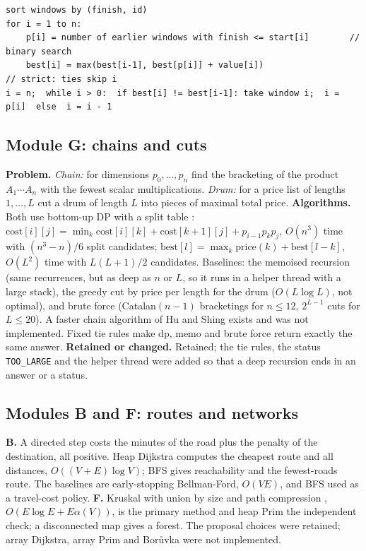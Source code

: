 \documentclass[11pt,a4paper]{article}
\newcommand{\cs}[1]{\texttt{#1}}
\begin{document}
\begin{lstlisting}[caption={Module C, weighted-interval DP with binary search.},captionpos=b,label=lst:c]
sort windows by (finish, id)
for i = 1 to n:
    p[i] = number of earlier windows with finish <= start[i]        // binary search
    best[i] = max(best[i-1], best[p[i]] + value[i])                  // strict: ties skip i
i = n;  while i > 0:  if best[i] != best[i-1]: take window i;  i = p[i]  else  i = i - 1
\end{lstlisting}

\subsection{Module G: chains and cuts}
\textbf{Problem.} \emph{Chain:} for dimensions $p_0,\dots,p_n$ find the bracketing of the product $A_1\cdots A_n$ with the fewest scalar multiplications. \emph{Drum:} for a price list of lengths $1,\dots,L$ cut a drum of length $L$ into pieces of maximal total price.
\textbf{Algorithms.} Both use bottom-up DP with a split table \cite{clrs}: $\text{cost}[i][j]=\min_k \text{cost}[i][k]+\text{cost}[k{+}1][j]+p_{i-1}p_kp_j$, $O(n^3)$ time with $(n^3-n)/6$ split candidates; $\text{best}[l]=\max_k \text{price}(k)+\text{best}[l-k]$, $O(L^2)$ time with $L(L+1)/2$ candidates.
Baselines: the memoised recursion (same recurrences, but as deep as $n$ or $L$, so it runs in a helper thread with a large stack), the greedy cut by price per length for the drum ($O(L\log L)$, not optimal), and brute force (Catalan$(n-1)$ bracketings for $n\le12$, $2^{L-1}$ cuts for $L\le20$). A faster chain algorithm of Hu and Shing \cite{hs} exists and was not implemented.
Fixed tie rules make dp, memo and brute force return exactly the same answer. \textbf{Retained or changed.} Retained; the tie rules, the status \cs{TOO\_LARGE} and the helper thread were added so that a deep recursion ends in an answer or a status.

\subsection{Modules B and F: routes and networks}
\textbf{B.} A directed step costs the minutes of the road plus the penalty of the destination, all positive. Heap Dijkstra \cite{dij} computes the cheapest route and all distances, $O((V+E)\log V)$; BFS gives reachability and the fewest-roads route.
The baselines are early-stopping Bellman-Ford, $O(VE)$, and BFS used as a travel-cost policy. \textbf{F.} Kruskal \cite{kru} with union by size and path compression \cite{tar}, $O(E\log E+E\alpha(V))$, is the primary method and heap Prim the independent check; a disconnected map gives a forest.
The proposal choices were retained; array Dijkstra, array Prim and Bor\r{u}vka were not implemented.
\end{document}
